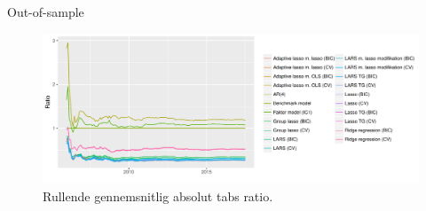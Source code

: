 \begin{frame}{Out-of-sample}
\begin{figure}
 \includegraphics[width=1\linewidth, height=0.7\textheight]{slides/rolling_mae.pdf}
 \caption{Rullende gennemsnitlig absolut tabs ratio.}
 \end{figure}
\end{frame}

